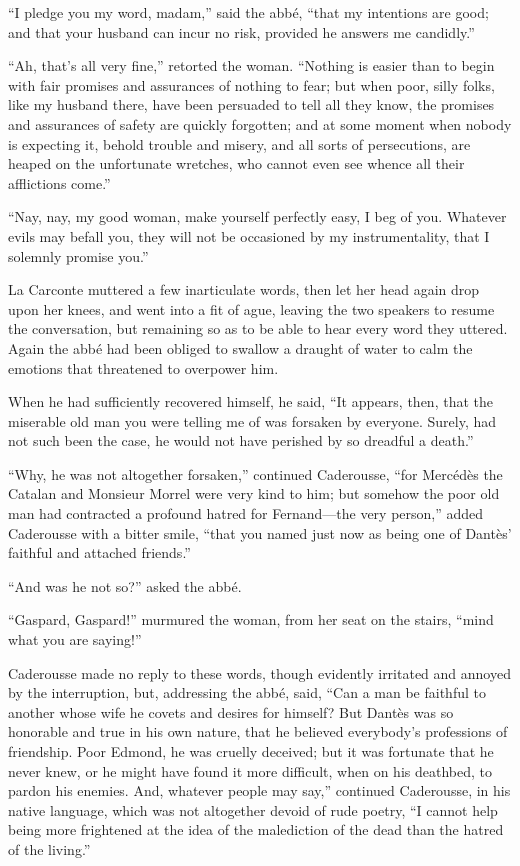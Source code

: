 “I pledge you my word, madam,” said the abbé, “that my intentions are
good; and that your husband can incur no risk, provided he answers me
candidly.”

“Ah, that’s all very fine,” retorted the woman. “Nothing is easier than
to begin with fair promises and assurances of nothing to fear; but when
poor, silly folks, like my husband there, have been persuaded to tell
all they know, the promises and assurances of safety are quickly
forgotten; and at some moment when nobody is expecting it, behold
trouble and misery, and all sorts of persecutions, are heaped on the
unfortunate wretches, who cannot even see whence all their afflictions
come.”

“Nay, nay, my good woman, make yourself perfectly easy, I beg of you.
Whatever evils may befall you, they will not be occasioned by my
instrumentality, that I solemnly promise you.”

La Carconte muttered a few inarticulate words, then let her head again
drop upon her knees, and went into a fit of ague, leaving the two
speakers to resume the conversation, but remaining so as to be able to
hear every word they uttered. Again the abbé had been obliged to
swallow a draught of water to calm the emotions that threatened to
overpower him.

When he had sufficiently recovered himself, he said, “It appears, then,
that the miserable old man you were telling me of was forsaken by
everyone. Surely, had not such been the case, he would not have
perished by so dreadful a death.”

“Why, he was not altogether forsaken,” continued Caderousse, “for
Mercédès the Catalan and Monsieur Morrel were very kind to him; but
somehow the poor old man had contracted a profound hatred for
Fernand—the very person,” added Caderousse with a bitter smile, “that
you named just now as being one of Dantès’ faithful and attached
friends.”

“And was he not so?” asked the abbé.

“Gaspard, Gaspard!” murmured the woman, from her seat on the stairs,
“mind what you are saying!”

Caderousse made no reply to these words, though evidently irritated and
annoyed by the interruption, but, addressing the abbé, said, “Can a man
be faithful to another whose wife he covets and desires for himself?
But Dantès was so honorable and true in his own nature, that he
believed everybody’s professions of friendship. Poor Edmond, he was
cruelly deceived; but it was fortunate that he never knew, or he might
have found it more difficult, when on his deathbed, to pardon his
enemies. And, whatever people may say,” continued Caderousse, in his
native language, which was not altogether devoid of rude poetry, “I
cannot help being more frightened at the idea of the malediction of the
dead than the hatred of the living.”

